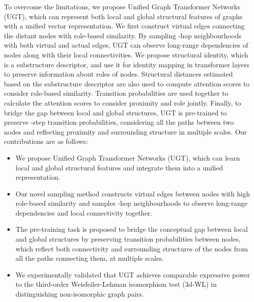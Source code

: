 \documentclass[oneside]{article}
\begin{document}
To overcome the limitations, we propose Unified Graph Transformer Networks (UGT), which can represent both local and global structural features of graphs with a unified vector representation. 
We first construct virtual edges connecting the distant nodes with role-based similarity. 
By sampling -hop neighbourhoods with both virtual and actual edges, UGT can observe long-range dependencies of nodes along with their local connectivities. 
We propose structural identity, which is a substructure descriptor, and use it for identity mapping in transformer layers to preserve information about roles of nodes. 
Structural distances estimated based on the substructure descriptor are also used to compute attention scores to consider role-based similarity. 
Transition probabilities are used together to calculate the attention scores to consider proximity and role jointly.
Finally, to bridge the gap between local and global structures, UGT is pre-trained to preserve -step transition probabilities, considering all the paths between two nodes and reflecting proximity and surrounding structure in multiple scales. 
Our contributions are as follows:
\begin{itemize}
    \item We propose Unified Graph Transformer Networks (UGT), which can learn local and global structural features and integrate them into a unified representation.
    \item Our novel sampling method constructs virtual edges between nodes with high role-based similarity and samples -hop neighbourhoods to observe long-range dependencies and local connectivity together. 
    \item The pre-training task is proposed to bridge the conceptual gap between local and global structures by preserving transition probabilities between nodes, which reflect both connectivity and surrounding structures of the nodes from all the paths connecting them, at multiple scales. 
    \item We experimentally validated that UGT achieves comparable expressive power to the third-order Weisfeiler-Lehman isomorphism test (3d-WL) in distinguishing non-isomorphic graph pairs.
\end{itemize}
\end{document}
